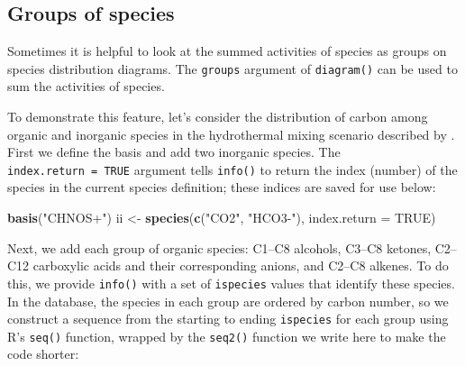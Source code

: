 \documentclass[]{tufte-handout}
\newenvironment{Shaded}{}{}
\newcommand{\KeywordTok}[1]{\textcolor[rgb]{0.00,0.44,0.13}{\textbf{#1}}}
\newcommand{\DataTypeTok}[1]{\textcolor[rgb]{0.56,0.13,0.00}{#1}}
\newcommand{\StringTok}[1]{\textcolor[rgb]{0.25,0.44,0.63}{#1}}
\newcommand{\OtherTok}[1]{\textcolor[rgb]{0.00,0.44,0.13}{#1}}
\newcommand{\NormalTok}[1]{#1}
\begin{document}
\subsection{Groups of species}\label{groups-of-species}

Sometimes it is helpful to look at the summed activities of species as
groups on species distribution diagrams. The \texttt{groups} argument of
{\texttt{diagram()}} can be used to sum the activities of species.

To demonstrate this feature, let's consider the distribution of carbon
among organic and inorganic species in the hydrothermal mixing scenario
described by \citet{SS98}. First we define the basis and add two
inorganic species. The \texttt{index.return\ =\ TRUE} argument tells
{\texttt{info()}} to return the index (number) of the species in the
current species definition; these indices are saved for use below:

\begin{Shaded}
\begin{Highlighting}[]
\KeywordTok{basis}\NormalTok{(}\StringTok{"CHNOS+"}\NormalTok{)}
\NormalTok{ii <-}\StringTok{ }\KeywordTok{species}\NormalTok{(}\KeywordTok{c}\NormalTok{(}\StringTok{"CO2"}\NormalTok{, }\StringTok{"HCO3-"}\NormalTok{), }\DataTypeTok{index.return =} \OtherTok{TRUE}\NormalTok{)}
\end{Highlighting}
\end{Shaded}

Next, we add each group of organic species: C1--C8 alcohols, C3--C8
ketones, C2--C12 carboxylic acids and their corresponding anions, and
C2--C8 alkenes. To do this, we provide {\texttt{info()}} with a set of
\texttt{ispecies} values that identify these species. In the database,
the species in each group are ordered by carbon number, so we construct
a sequence from the starting to ending \texttt{ispecies} for each group
using R's \texttt{seq()} function, wrapped by the \texttt{seq2()}
function we write here to make the code shorter:
\end{document}
